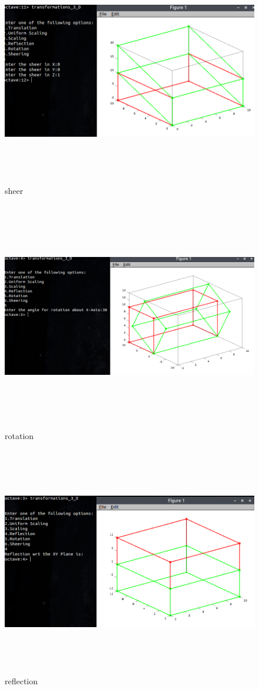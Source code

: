 \begin{figure}[ht!]
\centering
\includegraphics[width=150mm, height=100mm]{sheer.png}
\caption{sheer \label{overflow}}
\end{figure}
\begin{figure}[ht!]
\centering
\includegraphics[width=150mm, height=100mm]{rotation.png}
\caption{rotation \label{overflow}}
\end{figure}
\begin{figure}[ht!]
\centering
\includegraphics[width=150mm, height=100mm]{reflection.png}
\caption{reflection \label{overflow}}
\end{figure}

